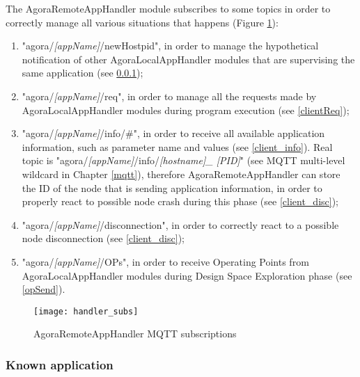 The AgoraRemoteAppHandler module subscribes to some topics in order to correctly manage all various situations that happens (Figure \ref{fig::remotSubs}):

\begin{enumerate}

    \item "agora/\textit{[appName]}/newHostpid", in order to manage the hypothetical notification of other AgoraLocalAppHandler modules that are supervising the same application (see \ref{knownApp});
    
    \item "agora/\textit{[appName]}/req", in order to manage all the requests made by AgoraLocalAppHandler modules during program execution (see \ref{clientReq});
    
    \item "agora/\textit{[appName]}/info/\#", in order to receive all available application information, such as parameter name and values (see \ref{client_info}). Real topic is "agora\slash{}\textit{[appName]}\slash{}info\slash{}\textit{[host\-name]\_ [PID]}" (see MQTT multi-level wildcard in Chapter \ref{mqtt}), therefore Agora\-Remote\-App\-Handler can store the ID of the node that is sending application information, in order to properly react to possible node crash during this phase (see \ref{client_disc});
    
    \item "agora/\textit{[appName]}/disconnection", in order to correctly react to a possible node disconnection (see \ref{client_disc});
    
    \item "agora/\textit{[appName]}/OPs", in order to receive Operating Points from AgoraLocalAppHandler modules during Design Space Exploration phase (see \ref{opSend}).

\end{enumerate}

\begin{figure}[t]

    \centering
    \texttt{[image: handler\_subs]}
    \caption{AgoraRemoteAppHandler MQTT subscriptions}

    \label{fig::remotSubs}
    
\end{figure}


\subsubsection{Known application}\label{knownApp}

